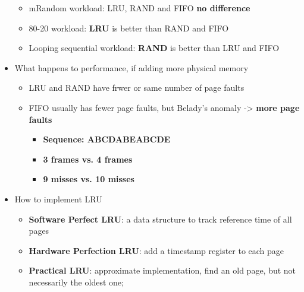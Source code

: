 \documentclass[a4paper,11pt,english]{article}
\begin{document}
\begin{itemize}
        \begin{itemize}
            \item mRandom workload: LRU, RAND and FIFO \textbf{\color{red} no difference}
            \item 80-20 workload: \textbf{\color{blue} LRU} is better than RAND and FIFO
            \item Looping sequential workload: \textbf{\color{blue} RAND} is better than LRU and FIFO
        \end{itemize}
    \item What happens to performance, if adding more physical memory
        \begin{itemize}
            \item LRU and RAND have frwer or same number of page faults
            \item FIFO usually has fewer page faults, but Belady's anomaly -> \textbf{\color{red}more page faults}
                \begin{itemize}
                    \item \textbf{Sequence: ABCDABEABCDE}
                    \item \textbf{\color{red} 3 frames vs. 4 frames}
                    \item \textbf{\color{red} 9 misses vs. 10 misses}
                \end{itemize}
        \end{itemize}
    \item How to implement LRU 
        \begin{itemize}
            \item \textbf{\color{red} Software Perfect LRU}: a data structure to track reference time of all pages
            \item \textbf{\color{red} Hardware Perfection LRU}: add a timestamp register to each page
            \item \textbf{\color{blue} Practical LRU}: approximate implementation, find an old page, but not necessarily the oldest one;
        \end{itemize}
\end{itemize}
\end{document}
